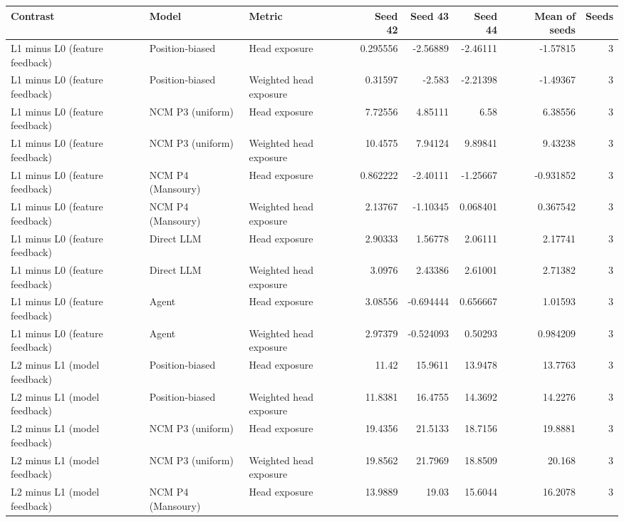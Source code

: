 \begin{table}[htbp!]
\centering
\small
\setlength{\tabcolsep}{3pt}
\renewcommand{\arraystretch}{1.1}
\begin{tabular}{lllrrrrr}
\hline
Contrast & Model & Metric & Seed 42 & Seed 43 & Seed 44 & Mean of seeds & Seeds \\
\hline
L1 minus L0 (feature feedback) & Position-biased & Head exposure & 0.295556 & -2.56889 & -2.46111 & -1.57815 & 3 \\
L1 minus L0 (feature feedback) & Position-biased & Weighted head exposure & 0.31597 & -2.583 & -2.21398 & -1.49367 & 3 \\
L1 minus L0 (feature feedback) & NCM P3 (uniform) & Head exposure & 7.72556 & 4.85111 & 6.58 & 6.38556 & 3 \\
L1 minus L0 (feature feedback) & NCM P3 (uniform) & Weighted head exposure & 10.4575 & 7.94124 & 9.89841 & 9.43238 & 3 \\
L1 minus L0 (feature feedback) & NCM P4 (Mansoury) & Head exposure & 0.862222 & -2.40111 & -1.25667 & -0.931852 & 3 \\
L1 minus L0 (feature feedback) & NCM P4 (Mansoury) & Weighted head exposure & 2.13767 & -1.10345 & 0.068401 & 0.367542 & 3 \\
L1 minus L0 (feature feedback) & Direct LLM & Head exposure & 2.90333 & 1.56778 & 2.06111 & 2.17741 & 3 \\
L1 minus L0 (feature feedback) & Direct LLM & Weighted head exposure & 3.0976 & 2.43386 & 2.61001 & 2.71382 & 3 \\
L1 minus L0 (feature feedback) & Agent & Head exposure & 3.08556 & -0.694444 & 0.656667 & 1.01593 & 3 \\
L1 minus L0 (feature feedback) & Agent & Weighted head exposure & 2.97379 & -0.524093 & 0.50293 & 0.984209 & 3 \\
L2 minus L1 (model feedback) & Position-biased & Head exposure & 11.42 & 15.9611 & 13.9478 & 13.7763 & 3 \\
L2 minus L1 (model feedback) & Position-biased & Weighted head exposure & 11.8381 & 16.4755 & 14.3692 & 14.2276 & 3 \\
L2 minus L1 (model feedback) & NCM P3 (uniform) & Head exposure & 19.4356 & 21.5133 & 18.7156 & 19.8881 & 3 \\
L2 minus L1 (model feedback) & NCM P3 (uniform) & Weighted head exposure & 19.8562 & 21.7969 & 18.8509 & 20.168 & 3 \\
L2 minus L1 (model feedback) & NCM P4 (Mansoury) & Head exposure & 13.9889 & 19.03 & 15.6044 & 16.2078 & 3 \\

\end{tabular}
\end{table}
